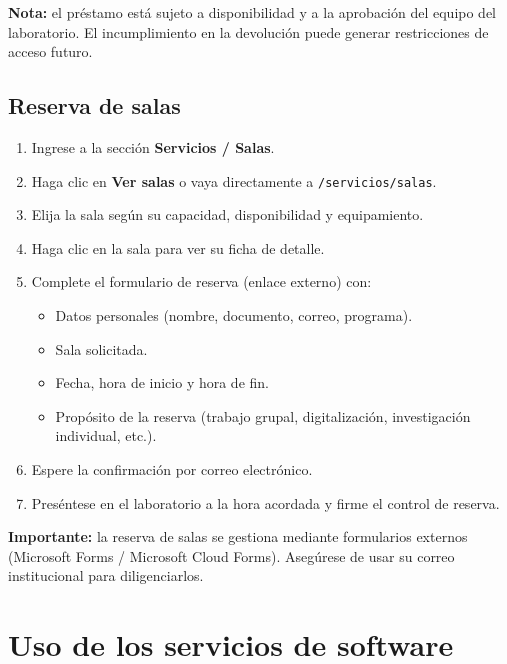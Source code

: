 \documentclass[12pt,a4paper]{report}
\begin{document}
\begin{mdframed}[style=importantstyle]
  \textbf{Nota:} el préstamo está sujeto a disponibilidad y a la aprobación
  del equipo del laboratorio. El incumplimiento en la devolución puede generar
  restricciones de acceso futuro.
\end{mdframed}

\section{Reserva de salas}

\begin{enumerate}
  \item Ingrese a la sección \textbf{Servicios / Salas}.
  \item Haga clic en \textbf{Ver salas} o vaya directamente a
        \texttt{/servicios/salas}.
  \item Elija la sala según su capacidad, disponibilidad y equipamiento.
  \item Haga clic en la sala para ver su ficha de detalle.
  \item Complete el formulario de reserva (enlace externo) con:
        \begin{itemize}
          \item Datos personales (nombre, documento, correo, programa).
          \item Sala solicitada.
          \item Fecha, hora de inicio y hora de fin.
          \item Propósito de la reserva (trabajo grupal, digitalización,
                investigación individual, etc.).
        \end{itemize}
  \item Espere la confirmación por correo electrónico.
  \item Preséntese en el laboratorio a la hora acordada y firme el control de
        reserva.
\end{enumerate}

\begin{mdframed}[style=importantstyle]
  \textbf{Importante:} la reserva de salas se gestiona mediante formularios
  externos (Microsoft Forms / Microsoft Cloud Forms). Asegúrese de usar su
  correo institucional para diligenciarlos.
\end{mdframed}

\chapter{Uso de los servicios de software}
\end{document}
